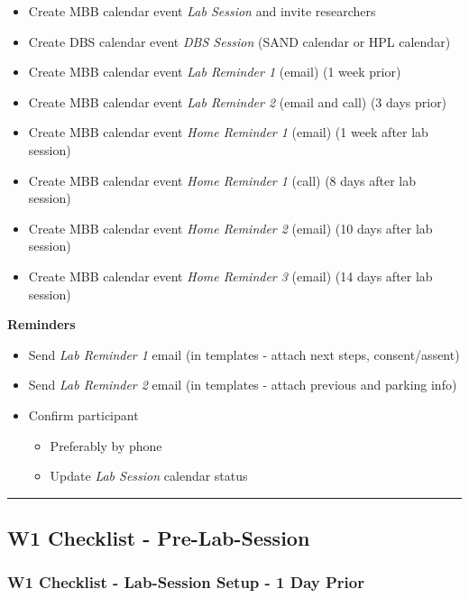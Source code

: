 \documentclass[]{book}
\providecommand{\tightlist}{%
  \setlength{\itemsep}{0pt}\setlength{\parskip}{0pt}}
\begin{document}
\begin{itemize}
\tightlist
\item
  Create MBB calendar event \emph{Lab Session} and invite researchers
\item
  Create DBS calendar event \emph{DBS Session} (SAND calendar or HPL calendar)
\item
  Create MBB calendar event \emph{Lab Reminder 1} (email) (1 week prior)
\item
  Create MBB calendar event \emph{Lab Reminder 2} (email and call) (3 days prior)
\item
  Create MBB calendar event \emph{Home Reminder 1} (email) (1 week after lab session)
\item
  Create MBB calendar event \emph{Home Reminder 1} (call) (8 days after lab session)
\item
  Create MBB calendar event \emph{Home Reminder 2} (email) (10 days after lab session)
\item
  Create MBB calendar event \emph{Home Reminder 3} (email) (14 days after lab session)
\end{itemize}

\textbf{Reminders}

\begin{itemize}
\tightlist
\item
  Send \emph{Lab Reminder 1} email (in templates - attach next steps, consent/assent)
\item
  Send \emph{Lab Reminder 2} email (in templates - attach previous and parking info)
\item
  Confirm participant

  \begin{itemize}
  \tightlist
  \item
    Preferably by phone
  \item
    Update \emph{Lab Session} calendar status
  \end{itemize}
\end{itemize}

\begin{center}\rule{0.5\linewidth}{0.5pt}\end{center}

\hypertarget{w1-checklist---pre-lab-session}{%
\subsection{W1 Checklist - Pre-Lab-Session}\label{w1-checklist---pre-lab-session}}

\hypertarget{w1-checklist---lab-session-setup---1-day-prior}{%
\subsubsection{W1 Checklist - Lab-Session Setup - 1 Day Prior}\label{w1-checklist---lab-session-setup---1-day-prior}}
\end{document}
